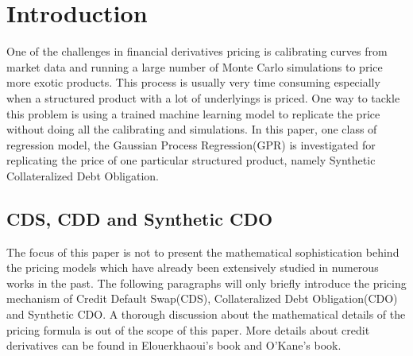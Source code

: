 \documentclass[11pt,a4paper]{article}
\theoremstyle{definition}
\numberwithin{equation}{section}
\begin{document}
	
	
	
	\setcounter{tocdepth}{4}
	
	\tableofcontents %
	
	\newpage %
	
	\fancyhead{}
	\fancyfoot{}
	\pagestyle{fancy} 
	\fancyhead[RO,LE]{\sffamily\small \thepage}
	\fancyhead[LO,RE]{\sffamily\small \nouppercase{\rightmark}}
	\renewcommand{\headrulewidth}{0.35pt}
	\renewcommand{\footrulewidth}{0.0pt}
	
	
	
	
	
	\section{Introduction}
	One of the challenges in financial derivatives pricing is calibrating curves from market data and running a large number of Monte Carlo simulations to price more exotic products. This process is usually very time consuming especially when a  structured product with a lot of underlyings is priced. One way to tackle this problem  is using a trained machine learning model to replicate the price without doing all the calibrating and simulations. In this paper, one class of regression model, the Gaussian Process Regression(GPR) is investigated for replicating the price of one particular structured product, namely Synthetic Collateralized Debt Obligation.
	
	\subsection{CDS, CDD and Synthetic CDO}
	The focus of this paper is not to present the mathematical sophistication behind the pricing models which have already been extensively studied in numerous works in the past. The following paragraphs will only briefly introduce the pricing mechanism of Credit Default Swap(CDS), Collateralized Debt Obligation(CDO) and Synthetic CDO. A thorough discussion about the mathematical details of the pricing formula is out of the scope of this paper. More details about credit derivatives can be found in Elouerkhaoui's book\cite{Elouerkhaoui} and O'Kane's book\cite{okane}.
	
\end{document}
